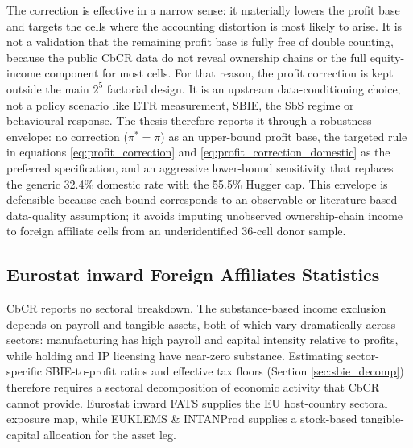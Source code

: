\documentclass[11pt,a4paper]{article}
\begin{document}
The correction is effective in a narrow sense: it materially lowers the profit base and targets the cells where the accounting distortion is most likely to arise. It is not a validation that the remaining profit base is fully free of double counting, because the public CbCR data do not reveal ownership chains or the full equity-income component for most cells. For that reason, the profit correction is kept outside the main $2^5$ factorial design. It is an upstream data-conditioning choice, not a policy scenario like ETR measurement, SBIE, the SbS regime or behavioural response. The thesis therefore reports it through a robustness envelope: no correction ($\pi^*=\pi$) as an upper-bound profit base, the targeted rule in equations \eqref{eq:profit_correction} and \eqref{eq:profit_correction_domestic} as the preferred specification, and an aggressive lower-bound sensitivity that replaces the generic 32.4\% domestic rate with the 55.5\% Hugger cap. This envelope is defensible because each bound corresponds to an observable or literature-based data-quality assumption; it avoids imputing unobserved ownership-chain income to foreign affiliate cells from an underidentified 36-cell donor sample.

\subsection{Eurostat inward Foreign Affiliates Statistics}\label{sec:fats_main}

CbCR reports no sectoral breakdown. The substance-based income exclusion depends on payroll and tangible assets, both of which vary dramatically across sectors: manufacturing has high payroll and capital intensity relative to profits, while holding and IP licensing have near-zero substance. Estimating sector-specific SBIE-to-profit ratios and effective tax floors (Section \ref{sec:sbie_decomp}) therefore requires a sectoral decomposition of economic activity that CbCR cannot provide. Eurostat inward FATS supplies the EU host-country sectoral exposure map, while EUKLEMS \& INTANProd supplies a stock-based tangible-capital allocation for the asset leg.
\end{document}
